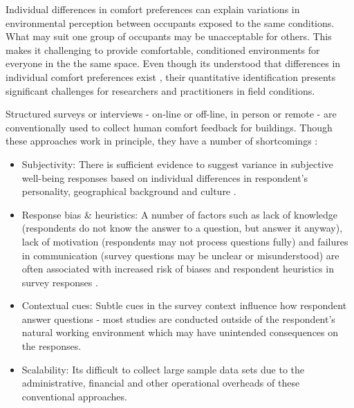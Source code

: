 

Individual differences in comfort preferences can explain variations in environmental perception between occupants exposed to the same conditions. What may suit one group of occupants may be unacceptable for others. This makes it 
challenging to provide comfortable, conditioned environments for everyone in the the same space. Even though its understood that differences in individual comfort preferences exist \cite{WANG2018181}, their quantitative identification presents significant challenges for researchers and practitioners in field conditions. 

Structured surveys or interviews - on-line or off-line, in person or remote - are conventionally used to collect human comfort feedback for buildings. Though these approaches work in principle, they have a number of shortcomings \cite{oecd}:  

\begin{itemize}
  \item Subjectivity: There is sufficient evidence to suggest variance in subjective well-being responses based on individual differences in respondent's personality, geographical background and culture \cite{subjectivewellbeing}.
  \item Response bias \& heuristics: A number of factors such as lack of knowledge (respondents do not know the answer to a question, but answer it anyway), lack of motivation (respondents may not process questions fully) and failures in communication (survey questions may be unclear or misunderstood) are often associated with increased risk of biases and respondent heuristics in survey responses \cite{bradburn2004asking}.
  \item Contextual cues: Subtle cues in the survey context influence how respondent answer questions \cite{krosnick1997seymour} - most studies are conducted outside of the respondent's natural working environment which may have unintended consequences on the responses. 
  \item Scalability: Its difficult to collect large sample data sets due to the administrative, financial and other operational overheads of these conventional approaches.
\end{itemize}


